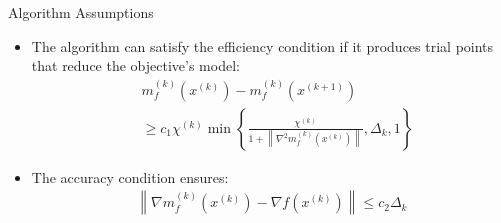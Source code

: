 \documentclass{beamer}
\newcommand{\xk}{{{x}^{(k)}}}
\begin{document}
\begin{frame}{Algorithm Assumptions}
	\begin{itemize}
		\item The algorithm can satisfy the efficiency condition if it produces trial points that reduce the objective's model:
		\begin{align*}
			& m_f^{(k)}\left(\xk\right) - m_f^{(k)}\left(x^{(k+1)}\right) \\
			& \ge c_1 \chi^{(k)} \min \left\{
				\frac{\chi^{(k)}}{1 + \left\|\nabla^2 m_f^{(k)}\left(x^{(k)}\right)\right\|},
				\Delta_k, 1\right\}
		\end{align*}
		\item The accuracy condition ensures:
		\begin{align*}
			\left\|\nabla m_f^{(k)}\left(x^{(k)}\right) - \nabla f\left(x^{(k)}\right)\right\| \le c_2 \Delta_k
		\end{align*}
	\end{itemize}
\end{frame}

% 		
\end{document}
